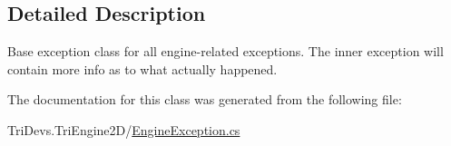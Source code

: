 \subsection{Detailed Description}
Base exception class for all engine-\/related exceptions. The inner exception will contain more info as to what actually happened. 



The documentation for this class was generated from the following file\-:\begin{DoxyCompactItemize}
\item 
Tri\-Devs.\-Tri\-Engine2\-D/\hyperlink{_engine_exception_8cs}{Engine\-Exception.\-cs}\end{DoxyCompactItemize}
